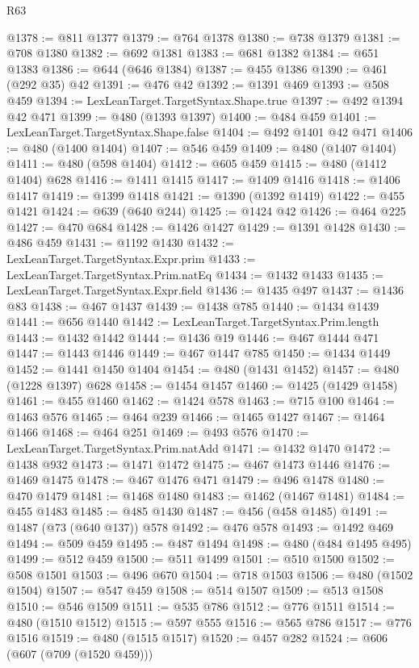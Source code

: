 \begin{lexlean}{R63}
\begin{coremodule}
@1378 := @811 @1377
@1379 := @764 @1378
@1380 := @738 @1379
@1381 := @708 @1380
@1382 := @692 @1381
@1383 := @681 @1382
@1384 := @651 @1383
@1386 := @644 (@646 @1384)
@1387 := @455 @1386
@1390 := @461 (@292 @35) @42
@1391 := @476 @42
@1392 := @1391 @469
@1393 := @508 @459
@1394 := LexLeanTarget.TargetSyntax.Shape.true
@1397 := @492 @1394 @42 @471
@1399 := @480 (@1393 @1397)
@1400 := @484 @459
@1401 := LexLeanTarget.TargetSyntax.Shape.false
@1404 := @492 @1401 @42 @471
@1406 := @480 (@1400 @1404)
@1407 := @546 @459
@1409 := @480 (@1407 @1404)
@1411 := @480 (@598 @1404)
@1412 := @605 @459
@1415 := @480 (@1412 @1404) @628
@1416 := @1411 @1415
@1417 := @1409 @1416
@1418 := @1406 @1417
@1419 := @1399 @1418
@1421 := @1390 (@1392 @1419)
@1422 := @455 @1421
@1424 := @639 (@640 @244)
@1425 := @1424 @42
@1426 := @464 @225
@1427 := @470 @684
@1428 := @1426 @1427
@1429 := @1391 @1428
@1430 := @486 @459
@1431 := @1192 @1430
@1432 := LexLeanTarget.TargetSyntax.Expr.prim
@1433 := LexLeanTarget.TargetSyntax.Prim.natEq
@1434 := @1432 @1433
@1435 := LexLeanTarget.TargetSyntax.Expr.field
@1436 := @1435 @497
@1437 := @1436 @83
@1438 := @467 @1437
@1439 := @1438 @785
@1440 := @1434 @1439
@1441 := @656 @1440
@1442 := LexLeanTarget.TargetSyntax.Prim.length
@1443 := @1432 @1442
@1444 := @1436 @19
@1446 := @467 @1444 @471
@1447 := @1443 @1446
@1449 := @467 @1447 @785
@1450 := @1434 @1449
@1452 := @1441 @1450 @1404
@1454 := @480 (@1431 @1452)
@1457 := @480 (@1228 @1397) @628
@1458 := @1454 @1457
@1460 := @1425 (@1429 @1458)
@1461 := @455 @1460
@1462 := @1424 @578
@1463 := @715 @100
@1464 := @1463 @576
@1465 := @464 @239
@1466 := @1465 @1427
@1467 := @1464 @1466
@1468 := @464 @251
@1469 := @493 @576
@1470 := LexLeanTarget.TargetSyntax.Prim.natAdd
@1471 := @1432 @1470
@1472 := @1438 @932
@1473 := @1471 @1472
@1475 := @467 @1473 @1446
@1476 := @1469 @1475
@1478 := @467 @1476 @471
@1479 := @496 @1478
@1480 := @470 @1479
@1481 := @1468 @1480
@1483 := @1462 (@1467 @1481)
@1484 := @455 @1483
@1485 := @485 @1430
@1487 := @456 (@458 @1485)
@1491 := @1487 (@73 (@640 @137)) @578
@1492 := @476 @578
@1493 := @1492 @469
@1494 := @509 @459
@1495 := @487 @1494
@1498 := @480 (@484 @1495 @495)
@1499 := @512 @459
@1500 := @511 @1499
@1501 := @510 @1500
@1502 := @508 @1501
@1503 := @496 @670
@1504 := @718 @1503
@1506 := @480 (@1502 @1504)
@1507 := @547 @459
@1508 := @514 @1507
@1509 := @513 @1508
@1510 := @546 @1509
@1511 := @535 @786
@1512 := @776 @1511
@1514 := @480 (@1510 @1512)
@1515 := @597 @555
@1516 := @565 @786
@1517 := @776 @1516
@1519 := @480 (@1515 @1517)
@1520 := @457 @282
@1524 := @606 (@607 (@709 (@1520 @459)))

\end{coremodule}
\end{lexlean}

